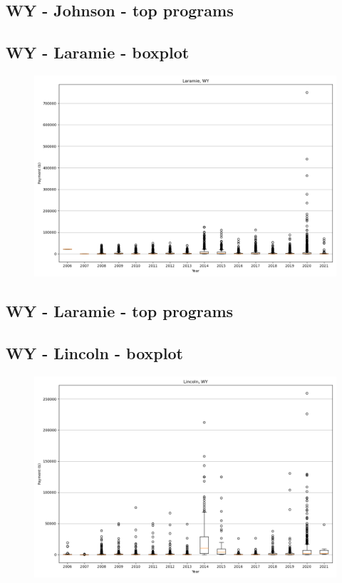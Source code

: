 \subsection*{WY - Johnson - top programs}

\newpage
\subsection*{WY - Laramie - boxplot}
\begin{figure}[h]
\centering
\includegraphics[width=7in]{../output/boxplots/counties/Laramie-WY_boxplot.png}
\end{figure}


\subsection*{WY - Laramie - top programs}

\newpage
\subsection*{WY - Lincoln - boxplot}
\begin{figure}[h]
\centering
\includegraphics[width=7in]{../output/boxplots/counties/Lincoln-WY_boxplot.png}
\end{figure}


